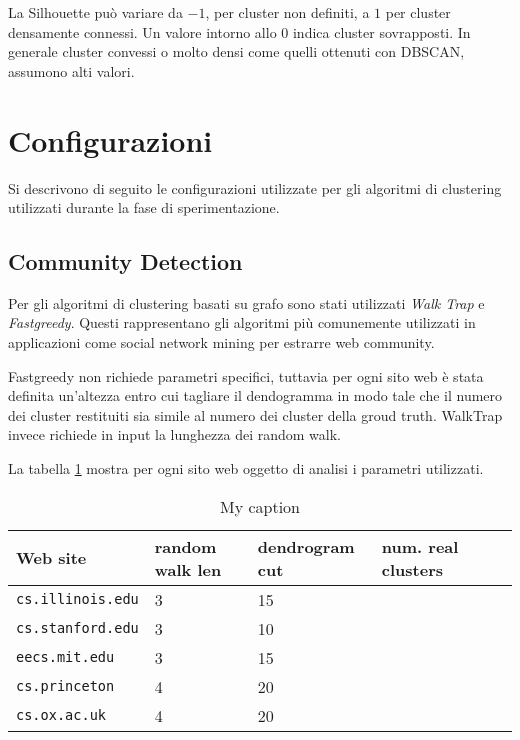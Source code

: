 La Silhouette può variare da $-1$, per cluster non definiti, a $1$ per cluster densamente connessi. Un valore intorno allo $0$ indica cluster sovrapposti. In generale cluster convessi o molto densi come quelli ottenuti con DBSCAN, assumono alti valori.
\section{Configurazioni}
Si descrivono di seguito le configurazioni utilizzate per gli algoritmi di clustering utilizzati durante la fase di sperimentazione. 

\subsection{Community Detection}
Per gli algoritmi di clustering basati su grafo sono stati utilizzati \textit{Walk Trap} e \textit{Fastgreedy}. Questi rappresentano gli algoritmi più comunemente utilizzati in applicazioni come social network mining per estrarre web community.

Fastgreedy non richiede parametri specifici, tuttavia per ogni sito web è stata definita un'altezza entro cui tagliare il dendogramma in modo tale che il numero dei cluster restituiti sia simile al numero dei cluster della groud truth. WalkTrap invece richiede in input la lunghezza dei random walk.



La tabella \ref{tabwebsites} mostra per ogni sito web oggetto di analisi i parametri utilizzati.

\begin{table}[]
\centering
\caption{My caption}
\label{tabwebsites}
\begin{tabular}{|l|l|l|l|l|l|}
\hline
 \textbf{Web site}& \textbf{random walk len} & \textbf{dendrogram cut} & \textbf{num. real clusters}\\ \hline
\texttt{cs.illinois.edu}  & 3 &   15 &\\ \hline
\texttt{cs.stanford.edu}& 3 & 10 &\\ \hline
\texttt{eecs.mit.edu} & 3 & 15 &\\ \hline
\texttt{cs.princeton} & 4 &   20&\\ \hline
\texttt{cs.ox.ac.uk} & 4 & 20  &\\ \hline
\end{tabular}
\end{table}

